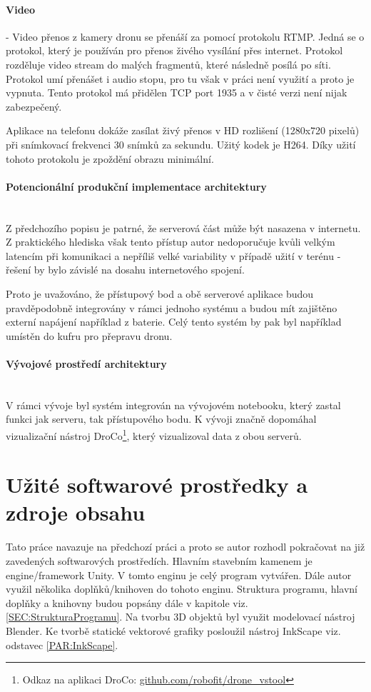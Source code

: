 \paragraph{Video} - Video přenos z kamery dronu se přenáší za pomocí protokolu RTMP. Jedná se o protokol, který je používán pro přenos živého vysílání přes internet. Protokol rozděluje video stream do malých fragmentů, které následně posílá po síti. Protokol umí přenášet i audio stopu, pro tu však v práci není využití a proto je vypnuta. Tento protokol má přidělen TCP port 1935 a v čisté verzi není nijak zabezpečený\cite{RTMP}. 

Aplikace na telefonu dokáže zasílat živý přenos v HD rozlišení (1280x720 pixelů) při snímkovací frekvenci 30 snímků za sekundu. Užitý kodek je H264. Díky užití tohoto protokolu je zpoždění obrazu minimální.

\paragraph{Potencionální produkční implementace architektury}\mbox{} \\
Z předchozího popisu je patrné, že serverová část může být nasazena v internetu. Z praktického hlediska však tento přístup autor nedoporučuje kvůli velkým latencím při komunikaci a nepříliš velké variability v případě užití v terénu - řešení by bylo závislé na dosahu internetového spojení. 

Proto je uvažováno, že přístupový bod a obě serverové aplikace budou pravděpodobně integrovány v rámci jednoho systému a budou mít zajištěno externí napájení například z baterie. Celý tento systém by pak byl například umístěn do kufru pro přepravu dronu. 

\paragraph{Vývojové prostředí architektury}\label{par:vyvojProstredi}\mbox{} \\
V rámci vývoje byl  systém integrován na vývojovém notebooku, který zastal funkci jak serveru, tak přístupového bodu. K vývoji značně dopomáhal vizualizační nástroj  DroCo\footnote{Odkaz na aplikaci DroCo: \href{https://github.com/robofit/drone\_vstool}{github.com/robofit/drone\_vstool}}, který vizualizoval data z obou serverů.

\section{Užité softwarové prostředky a zdroje obsahu} 
Tato práce navazuje na předchozí práci \cite{KyjacMartin2022Vnpp} a proto se autor rozhodl pokračovat na již zavedených softwarových prostředích. Hlavním stavebním kamenem je engine/framework Unity. V tomto enginu je celý program vytvářen. Dále autor využil několika doplňků/knihoven do tohoto enginu. Struktura programu, hlavní doplňky a knihovny budou popsány dále v kapitole viz. \ref{SEC:StrukturaProgramu}. 
Na tvorbu 3D objektů byl využit modelovací nástroj Blender. Ke tvorbě statické vektorové grafiky posloužil nástroj InkScape viz. odstavec \ref{PAR:InkScape}.  
